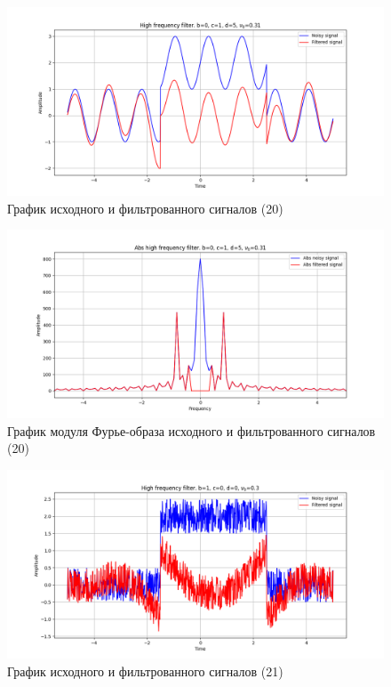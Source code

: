\documentclass[a4paper, 12pt]{article}
\begin{document}
    \begin{figure}[!htb]
        \centering
        \includegraphics[scale=0.48]{20_u_flt_u_nolow.png}
        \captionsetup{skip=0pt}
        \caption{График исходного и фильтрованного сигналов (20)}
        \label{fig:fig65}
    \end{figure}
    \begin{figure}[!htb]
        \centering
        \includegraphics[scale=0.48]{20_abs_u_U_nolow.png}
        \captionsetup{skip=0pt}
        \caption{График модуля Фурье-образа исходного и фильтрованного сигналов (20)}
        \label{fig:fig66}
    \end{figure}
    \begin{figure}[!htb]
        \centering
        \includegraphics[scale=0.48]{21_u_flt_u_nolow.png}
        \captionsetup{skip=0pt}
        \caption{График исходного и фильтрованного сигналов (21)}
        \label{fig:fig67}
    \end{figure}
\end{document}
